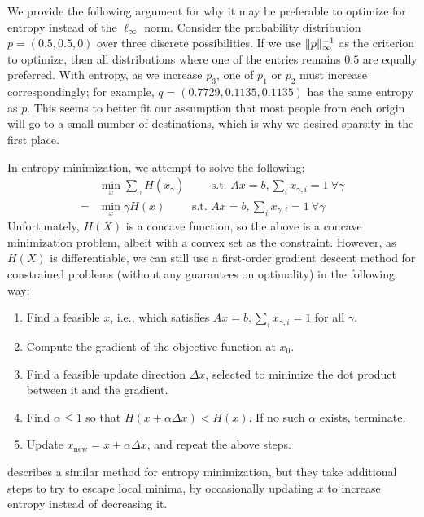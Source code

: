 \documentclass{article} %
\begin{document}
We provide the following argument for why it may be preferable to optimize for entropy instead of the $\ell_\infty$ norm.
Consider the probability distribution $p = (0.5, 0.5, 0)$ over three discrete possibilities.
If we use $\lVert p\rVert_{\infty}^{-1}$ as the criterion to optimize, then all distributions where one of the entries remains $0.5$ are equally preferred.
With entropy, as we increase $p_3$, one of $p_1$ or $p_2$ must increase correspondingly; for example, $q = (0.7729, 0.1135, 0.1135)$ has the same entropy as $p$.
This seems to better fit our assumption that most people from each origin will go to a small number of destinations, which is why we desired sparsity in the first place.

In entropy minimization, we attempt to solve the following:
\begin{align*}
&  \min_{x} \sum_\gamma H(x_\gamma) \qquad \text{ s.t. } Ax = b, \sum_i x_{\gamma, i} = 1\ \forall \gamma \\
=& \min_{x} \gamma H(x) \qquad \text{ s.t. } Ax = b, \sum_i x_{\gamma, i} = 1\ \forall \gamma
\end{align*}
Unfortunately, $H(X)$ is a concave function, so the above is a concave minimization problem, albeit with a convex set as the constraint.
However, as $H(X)$ is differentiable, we can still use a first-order gradient descent method for constrained problems (without any guarantees on optimality) in the following way:
\begin{enumerate}
  \item Find a feasible $x$, i.e., which satisfies $Ax = b, \sum_i x_{\gamma, i} = 1$ for all $\gamma$.
  \item Compute the gradient of the objective function at $x_0$.
  \item Find a feasible update direction $\Delta x$, selected to minimize the dot product between it and the gradient.
  \item Find $\alpha \le 1$ so that $H(x + \alpha \Delta x) < H(x)$. If no such $\alpha$ exists, terminate.
  \item Update $x_\textrm{new} = x + \alpha \Delta x$, and repeat the above steps.
\end{enumerate}
\cite{sudoku} describes a similar method for entropy minimization, but they take additional steps to try to escape local minima, by occasionally updating $x$ to increase entropy instead of decreasing it.
\end{document}
